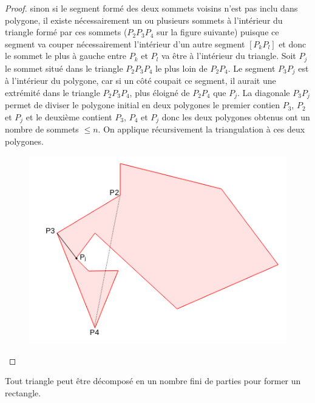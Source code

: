 \begin{proof}
\noindent
sinon si le segment formé des deux sommets voisins n'est pas inclu dans polygone, il existe nécessairement un ou plusieurs sommets à
l'intérieur du triangle formé par ces sommets ($P_2P_3P_4$ sur la figure suivante) puisque ce segment va couper nécessairement l'intérieur d'un autre segment $[P_kP_l]$ et donc le sommet le plus à gauche entre $P_k$ et $P_l$ va être à l'intérieur du triangle. Soit $P_j$ le sommet situé dans le triangle $P_2P_3P_4$ le plus loin de $P_2P_4$. Le segment $P_3P_j$ est à l'intérieur du polygone, car si un côté coupait ce segment, il aurait une extrémité dans le triangle $P_2P_3P_4$, plus éloigné de $P_2P_4$ que $P_j$.
La diagonale $P_3P_j$ permet de diviser le polygone initial en deux polygones le premier contien $P_3$, $P_2$ et $P_j$ et le deuxième contient $P_3$, $P_4$ et $P_j$ donc les deux polygones obtenus ont un nombre de sommets $\le n$. On applique récursivement la triangulation à ces deux polygones.

  \begin{figure}[h]
      \centering
      \includegraphics[scale=0.6]{images/x6.png}

  \end{figure}
\end{proof}
\begin{li}
  Tout triangle peut être décomposé en un nombre fini de parties pour former un rectangle.
\end{li}
